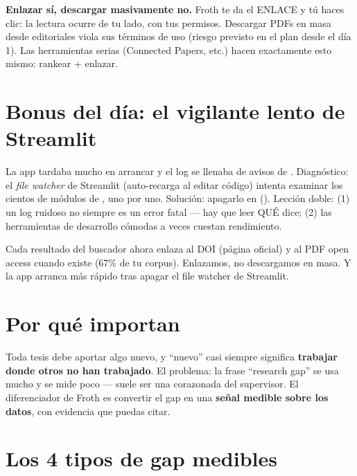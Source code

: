 \documentclass[11pt,a4paper]{article}
\begin{document}
\begin{ojo}
\textbf{Enlazar sí, descargar masivamente no.} Froth te da el ENLACE y tú haces clic: la
lectura ocurre de tu lado, con tus permisos. Descargar PDFs en masa desde editoriales viola
sus términos de uso (riesgo previsto en el plan desde el día 1). Las herramientas serias
(Connected Papers, etc.) hacen exactamente esto mismo: rankear + enlazar.
\end{ojo}

\section{Bonus del día: el vigilante lento de Streamlit}

La app tardaba mucho en arrancar y el log se llenaba de avisos de .
Diagnóstico: el \emph{file watcher} de Streamlit (auto-recarga al editar código) intenta
examinar los cientos de módulos de , uno por uno. Solución: apagarlo en
 (). Lección doble:
(1) un log ruidoso no siempre es un error fatal — hay que leer QUÉ dice; (2) las herramientas
de desarrollo cómodas a veces cuestan rendimiento.

\begin{resumen}
Cada resultado del buscador ahora enlaza al DOI (página oficial) y al PDF open access cuando
existe (67\% de tu corpus). Enlazamos, no descargamos en masa. Y la app arranca más rápido
tras apagar el file watcher de Streamlit.
\end{resumen}
\clearpage
{}
{}

\section{Por qué importan}

Toda tesis debe aportar algo nuevo, y ``nuevo'' casi siempre significa \textbf{trabajar donde
otros no han trabajado}. El problema: la frase ``research gap'' se usa mucho y se mide poco —
suele ser una corazonada del supervisor. El diferenciador de Froth es convertir el gap en
una \textbf{señal medible sobre los datos}, con evidencia que puedas citar.

\section{Los 4 tipos de gap medibles}
\end{document}
